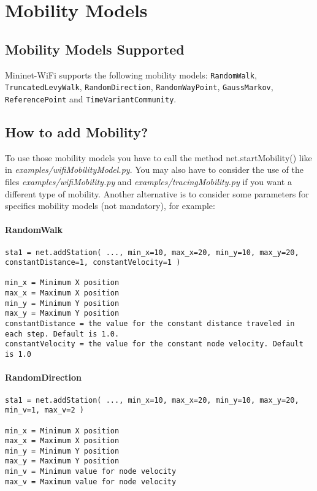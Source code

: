 \chapter{Mobility Models}

\section{Mobility Models Supported}
Mininet-WiFi supports the following mobility models: \texttt{RandomWalk}, \texttt{TruncatedLevyWalk}, \texttt{RandomDirection}, \texttt{RandomWayPoint}, \texttt{GaussMarkov}, \texttt{ReferencePoint} and \texttt{TimeVariantCommunity}.

\section{How to add Mobility?}
To use those mobility models you have to call the method net.startMobility() like in \textit{examples/wifiMobilityModel.py}. You may also have to consider the use of the files \textit{examples/wifiMobility.py} and \textit{examples/tracingMobility.py} if you want a different type of mobility. Another alternative is to consider some parameters for specifics mobility models (not mandatory), for example:

\subsubsection{RandomWalk}

\begin{verbatim}
sta1 = net.addStation( ..., min_x=10, max_x=20, min_y=10, max_y=20, constantDistance=1, constantVelocity=1 )

min_x = Minimum X position
max_x = Maximum X position
min_y = Minimum Y position
max_y = Maximum Y position
constantDistance = the value for the constant distance traveled in each step. Default is 1.0.
constantVelocity = the value for the constant node velocity. Default is 1.0
\end{verbatim}

\subsubsection{RandomDirection}

\begin{verbatim}
sta1 = net.addStation( ..., min_x=10, max_x=20, min_y=10, max_y=20, min_v=1, max_v=2 )

min_x = Minimum X position
max_x = Maximum X position
min_y = Minimum Y position
max_y = Maximum Y position
min_v = Minimum value for node velocity
max_v = Maximum value for node velocity
\end{verbatim}


